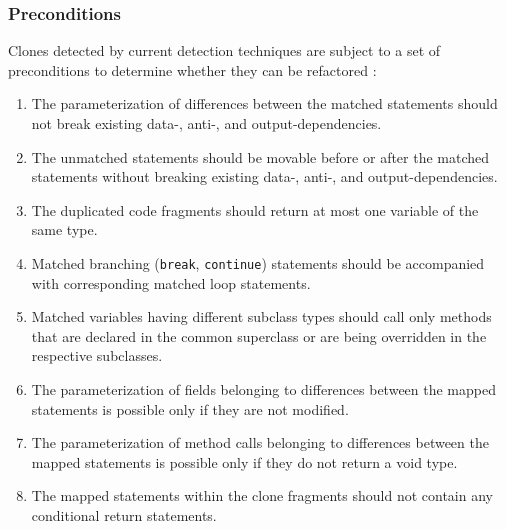 \documentclass[a4paper,UKenglish,cleveref, autoref, thm-restate,authorcolumns]{lipics-v2019}
\begin{document}
\subsubsection{Preconditions}
Clones detected by current detection techniques \cite{kamiya2002ccfinder, deissenboeck2010flexible, jiang2007deckard, cordy2011nicad} are subject to a set of preconditions to determine whether they can be refactored \cite{tsantalis2015assessing}:
\begin{enumerate}
  \item The parameterization of differences between the matched statements should not break existing data-, anti-, and output-dependencies.
  \item The unmatched statements should be movable before or after the matched statements without breaking existing data-, anti-, and output-dependencies.
  \item The duplicated code fragments should return at most one variable of the same type.
  \item Matched branching (\texttt{break}, \texttt{continue}) statements should be accompanied with corresponding matched loop statements.
  \item Matched variables having different subclass types should call only methods that are declared in the common superclass or are being overridden in the respective subclasses.
  \item The parameterization of fields belonging to differences between the mapped statements is possible only if they are not modified.
  \item The parameterization of method calls belonging to differences between the mapped statements is possible only if they do not return a void type.
  \item The mapped statements within the clone fragments should not contain any conditional return statements.
\end{enumerate}
\end{document}
